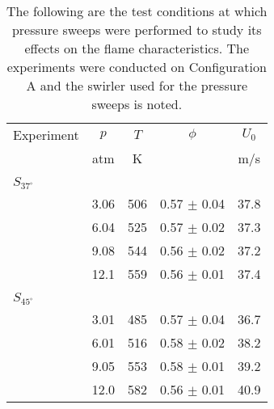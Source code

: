 \begin{table}
  \caption[Test conditions for studying pressure effects]{The following are the test conditions at which pressure sweeps were performed to study its effects on the flame characteristics. The experiments were conducted on Configuration A and the swirler used for the pressure sweeps is noted.}
  \begin{center}
    \begin{tabular}{lcccc}
      Experiment & \(p\) & \(T\) & \(\phi\) & \(U_0\) \tabularnewline
      & atm & K & & m/s \tabularnewline
      \hline\hline
      & & & & \tabularnewline
      \(S_{37^\circ}\) & & & & \tabularnewline
      \hline
      & 3.06 & 506 & 0.57 \(\pm\) 0.04 & 37.8 \tabularnewline
      & 6.04 & 525 & 0.57 \(\pm\) 0.02 & 37.3 \tabularnewline
      & 9.08 & 544 & 0.56 \(\pm\) 0.02 & 37.2 \tabularnewline
      & 12.1 & 559 & 0.56 \(\pm\) 0.01 & 37.4 \tabularnewline
      & & & & \tabularnewline
      \(S_{45^\circ}\) & & & & \tabularnewline
      \hline
      & 3.01 & 485 & 0.57 \(\pm\) 0.04 & 36.7 \tabularnewline
      & 6.01 & 516 & 0.58 \(\pm\) 0.02 & 38.2 \tabularnewline
      & 9.05 & 553 & 0.58 \(\pm\) 0.01 & 39.2 \tabularnewline
      & 12.0 & 582 & 0.56 \(\pm\) 0.01 & 40.9 \tabularnewline
      \hline
    \end{tabular}
  \end{center}
  \label{tab:pressureCases}
\end{table}

